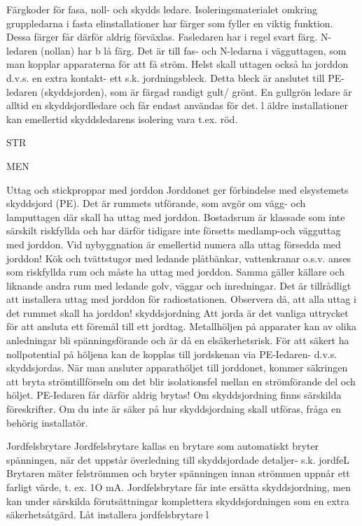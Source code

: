 \documentclass[a4paper,twoside,twocolumn,openright]{book}
\begin{document}
{{{{{Färgkoder för fasa, noll- och skydds ledare.
Isoleringsmaterialet omkring gruppledarna i
fasta elinstallationer har färger som fyller en
viktig funktion. Dessa färger får därför aldrig
förväxlas.
Fasledaren har i regel svart färg. N-ledaren (nollan) har b lå färg.
Det är till fas- och N-ledarna i vägguttagen, som man kopplar apparaterna för att få
ström. Helst skall uttagen också ha jorddon
d.v.s. en extra kontakt- ett s.k. jordningsbleck. Detta bleck är anslutet till PE-ledaren
(skyddsjorden), som är färgad randigt gult/
grönt.
En gullgrön ledare är alltid en skyddsjordledare och får endast användas för det.
l äldre installationer kan emellertid skyddsledarens isolering vara t.ex. röd.

STR

MEN

Uttag och stickproppar med jorddon
Jorddonet ger förbindelse med elsystemets
skyddsjord (PE).
Det är rummets utförande, som avgör om
vägg- och lamputtagen där skall ha uttag
med jorddon. Bostadsrum är klassade som
inte särskilt riskfyllda och har därför tidigare
inte försetts medlamp-och vägguttag med
jorddon. Vid nybyggnation är emellertid numera alla uttag försedda med jorddon!
Kök och tvättstugor med ledande plåtbänkar, vattenkranar o.s.v. anses som riskfyllda rum och måste ha uttag med jorddon.
Samma gäller källare och liknande andra
rum med ledande golv, väggar och inredningar.
Det är tillrådligt att installera uttag med
jorddon för radiostationen. Observera då, att
alla uttag i det rummet skall ha jorddon!
skyddsjordning
Att jorda är det vanliga uttrycket för att ansluta ett föremål till ett jordtag. Metallhöljen
på apparater kan av olika anledningar bli
spänningsförande och är då en elsäkerhetsrisk. För att säkert ha nollpotential på höljena
kan de kopplas till jordskenan via PE-Iedaren- d.v.s. skyddsjordas. När man ansluter
apparathöljet till jorddonet, kommer
säkringen att bryta strömtillförseln om det
blir isolationsfel mellan en strömförande del
och höljet. PE-Iedaren får därför aldrig brytas!
Om skyddsjordning finns särskilda föreskrifter. Om du inte är säker på hur skyddsjordning skall utföras, fråga en behörig installatör.

Jordfelsbrytare
Jordfelsbrytare kallas en brytare som automatiskt bryter spänningen, när det uppstår
överledning till skyddsjordade detaljer- s.k.
jordfeL Brytaren mäter felströmmen och bryter spänningen innan strömmen uppnår ett
farligt värde, t. ex. 1O mA. Jordfelsbrytare får
inte ersätta skyddsjordning, men kan under
särskilda förutsättningar komplettera
skyddsjordningen som en extra säkerhetsåtgärd. Låt installera jordfelsbrytare l

}}}}}
\end{document}
